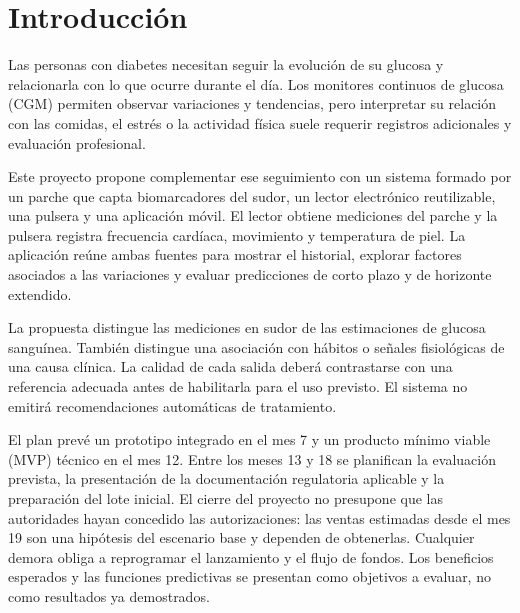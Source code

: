 \section{Introducción}

Las personas con diabetes necesitan seguir la evolución de su glucosa y relacionarla con lo que ocurre durante el día. Los monitores continuos de glucosa (CGM) permiten observar variaciones y tendencias, pero interpretar su relación con las comidas, el estrés o la actividad física suele requerir registros adicionales y evaluación profesional.

Este proyecto propone complementar ese seguimiento con un sistema formado por un parche que capta biomarcadores del sudor, un lector electrónico reutilizable, una pulsera y una aplicación móvil. El lector obtiene mediciones del parche y la pulsera registra frecuencia cardíaca, movimiento y temperatura de piel. La aplicación reúne ambas fuentes para mostrar el historial, explorar factores asociados a las variaciones y evaluar predicciones de corto plazo y de horizonte extendido.

La propuesta distingue las mediciones en sudor de las estimaciones de glucosa sanguínea. También distingue una asociación con hábitos o señales fisiológicas de una causa clínica. La calidad de cada salida deberá contrastarse con una referencia adecuada antes de habilitarla para el uso previsto. El sistema no emitirá recomendaciones automáticas de tratamiento.

El plan prevé un prototipo integrado en el mes 7 y un producto mínimo viable (MVP) técnico en el mes 12. Entre los meses 13 y 18 se planifican la evaluación prevista, la presentación de la documentación regulatoria aplicable y la preparación del lote inicial. El cierre del proyecto no presupone que las autoridades hayan concedido las autorizaciones: las ventas estimadas desde el mes 19 son una hipótesis del escenario base y dependen de obtenerlas. Cualquier demora obliga a reprogramar el lanzamiento y el flujo de fondos. Los beneficios esperados y las funciones predictivas se presentan como objetivos a evaluar, no como resultados ya demostrados.
